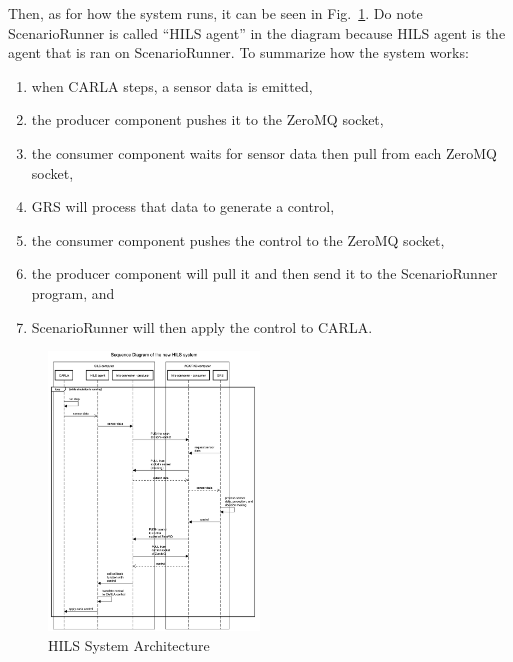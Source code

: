 Then, as for how the system runs, it can be seen in
Fig.~\ref{section-4-hils-sequence-diagram}. Do note ScenarioRunner is called
``HILS agent'' in the diagram because HILS agent is the agent that is ran on
ScenarioRunner. To summarize how the system works:
\begin{enumerate}
	\item when CARLA steps, a sensor data is emitted,
	\item the producer component pushes it to the ZeroMQ socket,
	\item the consumer component waits for sensor data then pull from each
	      ZeroMQ socket,
	\item GRS will process that data to generate a control,
	\item the consumer component pushes the control to the ZeroMQ socket,
	\item the producer component will pull it and then send it to the
	      ScenarioRunner program, and
	\item ScenarioRunner will then apply the control to CARLA.
\end{enumerate}

\begin{figure}[htbp]
	\centerline{\includegraphics[width=0.5\textwidth]{resources/chapter-3/sequence-diagram-new-hils-kasar-EN.png}}
	\caption{HILS System Architecture}
	\label{section-4-hils-sequence-diagram}
\end{figure}

